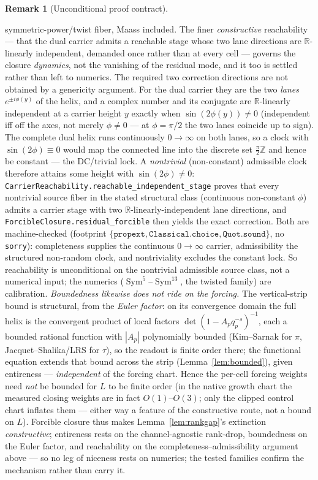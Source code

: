 \documentclass[11pt]{article}
\theoremstyle{definition}
\newtheorem{remark}[theorem]{Remark}
\newcommand{\Sym}{\operatorname{Sym}}
\begin{document}
\begin{remark}[Unconditional proof contract]
\begin{enumerate}
symmetric-power/twist fiber, Maass included. The finer \emph{constructive} reachability --- that the dual carrier admits a reachable stage whose two lane directions are $\mathbb R$-linearly independent, demanded once rather than at every cell --- governs the closure \emph{dynamics}, not the vanishing of the residual mode, and it too is settled rather than left to numerics. The required two correction directions are not obtained by a genericity argument. For the dual carrier they are the two \emph{lanes} $e^{\pm i\phi(y)}$ of the helix, and a complex number and its conjugate are $\mathbb R$-linearly independent at a carrier height $y$ exactly when $\sin(2\phi(y))\neq0$ (independent iff off the axes, not merely $\phi\neq0$ --- at $\phi=\pi/2$ the two lanes coincide up to sign). The complete dual helix runs continuously $0\to\infty$ on both lanes, so a clock with $\sin(2\phi)\equiv0$ would map the connected line into the discrete set $\tfrac{\pi}{2}\mathbb Z$ and hence be constant --- the DC/trivial lock. A \emph{nontrivial} (non-constant) admissible clock therefore attains some height with $\sin(2\phi)\neq0$: \texttt{CarrierReachability.reachable\_independent\_stage} proves that every nontrivial source fiber in the stated structural class (continuous non-constant $\phi$) admits a carrier stage with two $\mathbb R$-linearly-independent lane directions, and \texttt{ForcibleClosure.residual\_forcible} then yields the exact correction. Both are machine-checked (footprint $\{\texttt{propext},\texttt{Classical.choice},\texttt{Quot.sound}\}$, no \texttt{sorry}): completeness supplies the continuous $0\to\infty$ carrier, admissibility the structured non-random clock, and nontriviality excludes the constant lock. So reachability is unconditional on the nontrivial admissible source class, not a numerical input; the numerics ($\Sym^5$--$\Sym^{13}$, the twisted family) are calibration. \emph{Boundedness likewise does not ride on the forcing.} The vertical-strip bound is structural,
from the \emph{Euler factor}: on its convergence domain the full helix is the convergent product of local factors
$\det(1-A_{p}q_p^{-s})^{-1}$, each a bounded rational function with $|A_p|$ polynomially bounded (Kim--Sarnak for $\pi$, Jacquet--Shalika/LRS for $\tau$),
so the readout is finite order there; the functional equation extends that bound across the strip
(Lemma~\ref{lem:bounded}), given entireness --- \emph{independent} of the forcing chart. Hence the per-cell
forcing weights need \emph{not} be bounded for $L$ to be finite order (in the native growth chart the measured
closing weights are in fact $O(1)$--$O(3)$; only the clipped control chart inflates them --- either way a
feature of the constructive route, not a bound on $L$). Forcible closure
thus makes Lemma~\ref{lem:rankgap}'s extinction \emph{constructive}; entireness rests on the channel-agnostic
rank-drop, boundedness on the Euler factor, and reachability on the completeness--admissibility argument above ---
so no leg of niceness rests on numerics; the tested families confirm the mechanism rather than carry it.


\end{enumerate}
\end{remark}
\end{document}
